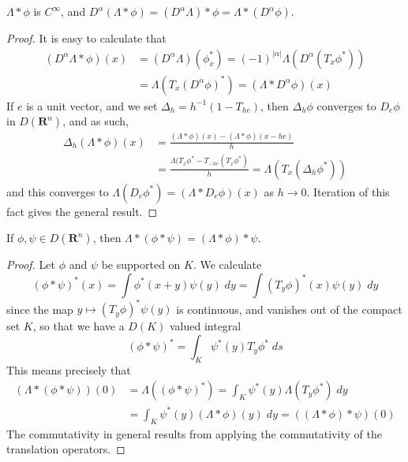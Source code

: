 \begin{theorem}
    $\Lambda * \phi$ is $C^\infty$, and $D^\alpha(\Lambda * \phi) = (D^\alpha \Lambda) * \phi = \Lambda * (D^\alpha \phi)$.
\end{theorem}
\begin{proof}
    It is easy to calculate that
    \begin{align*}
        (D^\alpha \Lambda * \phi)(x) &= (D^\alpha \Lambda)(\phi^*_x) = (-1)^{|\alpha|} \Lambda(D^\alpha (T_x \phi^*))\\
        &= \Lambda(T_x (D^\alpha \phi)^*) = (\Lambda * D^\alpha \phi)(x)
    \end{align*}
    If $e$ is a unit vector, and we set $\Delta_h = h^{-1} (1 - T_{he})$, then $\Delta_h \phi$ converges to $D_e \phi$ in $D(\mathbf{R}^n)$, and as such,
    \begin{align*}
        \Delta_h(\Lambda * \phi)(x) &= \frac{(\Lambda * \phi)(x) - (\Lambda * \phi)(x - he)}{h}\\
        &= \frac{\Lambda(T_x \phi^* - T_{-he} (T_x \phi^*)}{h} = \Lambda(T_x(\Delta_h \phi^*))
    \end{align*}
    and this converges to $\Lambda(D_e \phi^*) = (\Lambda * D_e \phi)(x)$ as $h \to 0$. Iteration of this fact gives the general result.
\end{proof}

\begin{theorem}
    If $\phi, \psi \in D(\mathbf{R}^n)$, then $\Lambda * (\phi * \psi) = (\Lambda * \phi) * \psi$.
\end{theorem}
\begin{proof}
    Let $\phi$ and $\psi$ be supported on $K$. We calculate
    \[ (\phi * \psi)^*(x) = \int \phi^*(x + y) \psi(y)\; dy = \int (T_y \phi)^*(x) \psi(y)\; dy \]
    since the map $y \mapsto (T_y \phi)^* \psi(y)$ is continuous, and vanishes out of the compact set $K$, so that we have a $D(K)$ valued integral
    \[ (\phi * \psi)^* = \int_K \psi^*(y) T_y \phi^*\; ds \]
    This means precisely that
    \begin{align*}
        (\Lambda * (\phi * \psi))(0) &= \Lambda((\phi * \psi)^*) = \int_K \psi^*(y) \Lambda(T_y \phi^*)\; dy\\
        &= \int_K \psi^*(y) (\Lambda * \phi)(y)\; dy = ((\Lambda * \phi) * \psi)(0)
    \end{align*}
    The commutativity in general results from applying the commutativity of the translation operators.
\end{proof}

